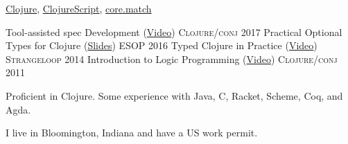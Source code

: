 \documentclass[10pt,a4paper]{article}
\begin{document}
%
\bodytext
  {\href{https://github.com/clojure/clojure/commits?author=frenchy64}{Clojure},
   \href{https://github.com/clojure/clojurescript/commits?author=frenchy64}{ClojureScript},
   \href{https://github.com/clojure/core.match/commits?author=frenchy64}{core.match}
   }



\headedsection
  {Tool-assisted spec Development (\href{https://www.youtube.com/watch?v=kcZVkvO1Dpo}{Video})}
  {\textsc{Clojure/conj 2017}} {%
}
\headedsection
  {Practical Optional Types for Clojure (\href{http://ambrosebs.com/talks/esop16.pdf}{Slides})}
  {\textsc{ESOP 2016}} {%
  }
\headedsection
  {Typed Clojure in Practice (\href{https://www.youtube.com/watch?v=a0gT0syAXsY}{Video})}
  {\textsc{Strangeloop 2014}} {%
}
\headedsection
  {Introduction to Logic Programming (\href{https://www.youtube.com/watch?v=irjP8BO1B8Y}{Video})}
  {\textsc{Clojure/conj 2011}} {%
}


\bodytext
  { Proficient in Clojure. Some experience with Java, C, Racket, Scheme, Coq, and Agda.}



\bodytext
  {I live in Bloomington, Indiana and have a US work permit.}


\end{document}
